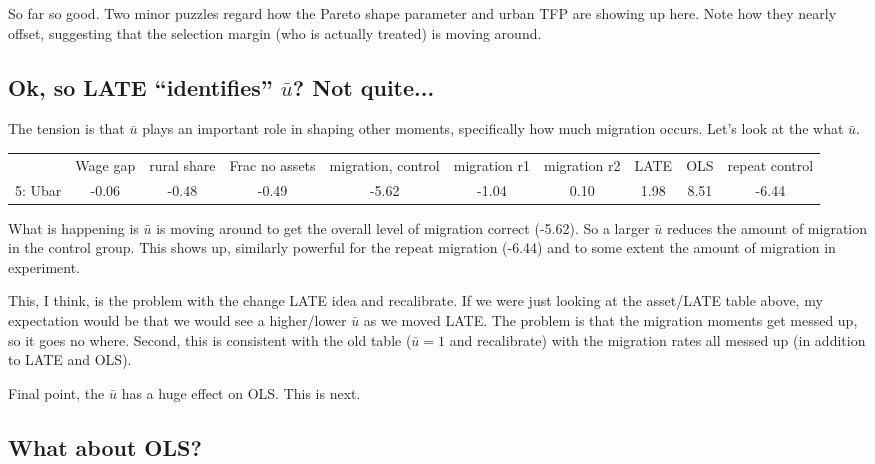 \documentclass[pdftex,11pt]{article}
\renewcommand{\arraystretch}{.7}
\begin{document}
So far so good. Two minor puzzles regard how the Pareto shape parameter and urban TFP are showing up here. Note how they nearly offset, suggesting that the selection margin (who is actually treated) is moving around. 

\subsection{Ok, so LATE ``identifies'' $\bar u$? Not quite...}

The tension is that $\bar u$ plays an important role in shaping other moments, specifically how much migration occurs. Let's look at the what $\bar u$.

\begin{table}[!h]
\footnotesize
\setlength {\tabcolsep}{1.5mm}
\renewcommand{\arraystretch}{2.25}
\begin{center}\label{tb:employment}
\begin{tabular}{l c c c c c c c c c }
\hline
\hline
& Wage gap & rural share &  Frac no assets & migration, control &  migration r1 & migration r2 & LATE & OLS & repeat control \\
5: Ubar &  -0.06 &   -0.48 &  -0.49  & -5.62  & -1.04  &  0.10  &  1.98  &  8.51  & -6.44 \\

\hline
\hline
\end{tabular}
\end{center}
\end{table}

What is happening is $\bar u$ is moving around to get the overall level of migration correct (-5.62). So a larger $\bar u$ reduces the amount of migration in the control group. This shows up, similarly powerful for the repeat migration (-6.44) and to some extent the amount of migration in experiment.

This, I think, is the problem with the change LATE idea and recalibrate. If we were just looking at the asset/LATE table above, my expectation would be that we would see a higher/lower $\bar u$ as we moved LATE. The problem is that the migration moments get messed up, so it goes no where. Second, this is consistent with the old table ($\bar u = 1$ and recalibrate) with the migration rates all messed up (in addition to LATE and OLS). 

Final point, the $\bar u$ has a huge effect on OLS. This is next.

\subsection{What about OLS?}
\end{document}
